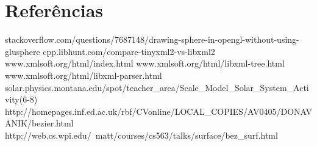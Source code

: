 \documentclass{article}
\begin{document}
\newpage

\section{Referências}
stackoverflow.com/questions/7687148/drawing-sphere-in-opengl-without-using-glusphere
\newline
cpp.libhunt.com/compare-tinyxml2-vs-libxml2
\newline
www.xmlsoft.org/html/index.html
\newline
www.xmlsoft.org/html/libxml-tree.html
\newline
www.xmlsoft.org/html/libxml-parser.html
\newline
solar.physics.montana.edu/spot/teacher\_area/Scale\_Model\_Solar\_System\_Activity(6-8)
\newline
http://homepages.inf.ed.ac.uk/rbf/CVonline/LOCAL\_COPIES/AV0405/DONAVANIK/bezier.html
\newline
http://web.cs.wpi.edu/~matt/courses/cs563/talks/surface/bez\_surf.html
\end{document}
